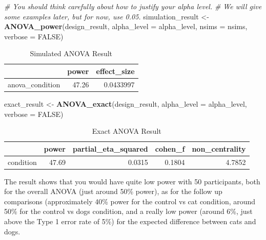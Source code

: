 \documentclass[]{book}
\newenvironment{Shaded}{\begin{snugshade}}{\end{snugshade}}
\newcommand{\CommentTok}[1]{\textcolor[rgb]{0.56,0.35,0.01}{\textit{#1}}}
\newcommand{\DataTypeTok}[1]{\textcolor[rgb]{0.13,0.29,0.53}{#1}}
\newcommand{\KeywordTok}[1]{\textcolor[rgb]{0.13,0.29,0.53}{\textbf{#1}}}
\newcommand{\NormalTok}[1]{#1}
\newcommand{\OtherTok}[1]{\textcolor[rgb]{0.56,0.35,0.01}{#1}}
\newcommand{\StringTok}[1]{\textcolor[rgb]{0.31,0.60,0.02}{#1}}
\begin{document}
\begin{Shaded}
\begin{Highlighting}[]
\CommentTok{# You should think carefully about how to justify your alpha level.}
\CommentTok{# We will give some examples later, but for now, use 0.05.}
\NormalTok{simulation_result <-}\StringTok{ }\KeywordTok{ANOVA_power}\NormalTok{(design_result, }
                                 \DataTypeTok{alpha_level =}\NormalTok{ alpha_level, }
                                 \DataTypeTok{nsims =}\NormalTok{ nsims,}
                                 \DataTypeTok{verbose =} \OtherTok{FALSE}\NormalTok{)}
\end{Highlighting}
\end{Shaded}

\begin{table}[t]

\caption{\label{tab:unnamed-chunk-32}Simulated ANOVA Result}
\centering
\begin{tabular}{l|r|r}
\hline
  & power & effect\_size\\
\hline
anova\_condition & 47.26 & 0.0433997\\
\hline
\end{tabular}
\end{table}

\begin{Shaded}
\begin{Highlighting}[]
\NormalTok{exact_result <-}\StringTok{ }\KeywordTok{ANOVA_exact}\NormalTok{(design_result,}
                            \DataTypeTok{alpha_level =}\NormalTok{ alpha_level,}
                            \DataTypeTok{verbose =} \OtherTok{FALSE}\NormalTok{)}
\end{Highlighting}
\end{Shaded}

\begin{table}[t]

\caption{\label{tab:unnamed-chunk-34}Exact ANOVA Result}
\centering
\begin{tabular}{l|r|r|r|r}
\hline
  & power & partial\_eta\_squared & cohen\_f & non\_centrality\\
\hline
condition & 47.69 & 0.0315 & 0.1804 & 4.7852\\
\hline
\end{tabular}
\end{table}

The result shows that you would have quite low power with 50 participants, both for the overall ANOVA (just around 50\% power), as for the follow up comparisons (approximately 40\% power for the control vs cat condition, around 50\% for the control vs dogs condition, and a really low power (around 6\%, just above the Type 1 error rate of 5\%) for the expected difference between cats and dogs.
\end{document}
